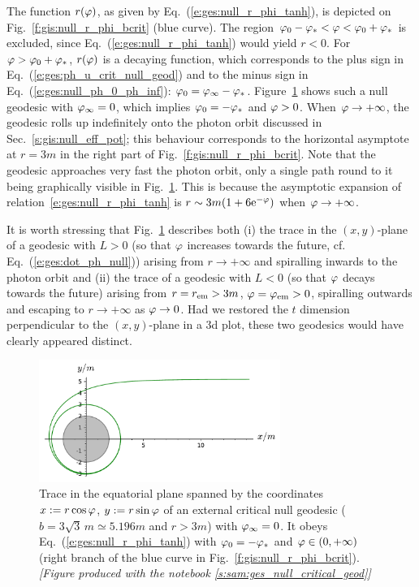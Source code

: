 The function $r(\varphi)$, as given by Eq.~(\ref{e:ges:null_r_phi_tanh}), is
depicted on Fig.~\ref{f:gis:null_r_phi_bcrit} (blue curve).
The region $\varphi_0-\varphi_* < \varphi < \varphi_0 + \varphi_*$ is excluded, since
Eq.~(\ref{e:ges:null_r_phi_tanh}) would yield $r<0$. For $\varphi > \varphi_0 + \varphi_*$,
$r(\varphi)$ is a decaying
function, which corresponds to the
plus sign in Eq.~(\ref{e:ges:ph_u_crit_null_geod}) and to the minus sign in
Eq.~(\ref{e:ges:null_ph_0_ph_inf}): $\varphi_0 = \varphi_\infty - \varphi_*$.
Figure~\ref{f:gis:null_b_crit_from_inf_L_pos} shows such a null geodesic with
$\varphi_\infty=0$, which implies $\varphi_0 = - \varphi_*$ and $\varphi>0$.
When $\varphi\to +\infty$, the geodesic rolls up indefinitely onto the photon
orbit discussed in Sec.~\ref{s:gis:null_eff_pot}; this
behaviour corresponds to the horizontal asymptote at $r=3m$ in
the right part of Fig.~\ref{f:gis:null_r_phi_bcrit}.
Note that the geodesic approaches very fast the photon orbit, only a single
path round to it being graphically visible in Fig.~\ref{f:gis:null_b_crit_from_inf_L_pos}.
This is because the asymptotic expansion of relation~\eqref{e:ges:null_r_phi_tanh} is
$r\sim 3m(1+ 6\mathrm{e}^{-\varphi})$ when $\varphi\to+\infty$.

It is worth stressing that Fig.~\ref{f:gis:null_b_crit_from_inf_L_pos} describes both (i) the trace
in the $(x,y)$-plane of a
geodesic with $L>0$ (so that $\varphi$ increases towards the future, cf. Eq.~(\ref{e:ges:dot_ph_null})) arising from $r\to + \infty$
and spiralling inwards to the photon orbit
and (ii) the trace of a geodesic with $L<0$ (so that $\varphi$ decays towards the future)
arising from $r=r_{\rm em} > 3 m$, $\varphi=\varphi_{\rm em}>0$,
spiralling outwards and escaping to $r\to +\infty$ as $\varphi\to 0$. Had we restored the
$t$ dimension perpendicular to the $(x,y)$-plane in a 3d plot, these two geodesics would have
clearly appeared distinct.

\begin{figure}
\centerline{\includegraphics[width=0.7\textwidth]{ges_null_b_crit_from_inf_L_pos.pdf}}
\caption[]{\label{f:gis:null_b_crit_from_inf_L_pos} \footnotesize
Trace in the equatorial plane spanned by the coordinates $x:=r\cos\varphi$, $y:=r\sin\varphi$
of an external critical null geodesic ($b = 3\sqrt{3} \, m \simeq 5.196 m$ and
$r>3m$) with $\varphi_\infty=0$.
It obeys Eq.~(\ref{e:ges:null_r_phi_tanh}) with $\varphi_0 = -\varphi_*$ and $\varphi\in(0,+\infty)$
(right branch of the blue curve in Fig.~\ref{f:gis:null_r_phi_bcrit}).
\textsl{[Figure produced with the notebook \ref{s:sam:ges_null_critical_geod}]}
}
\end{figure}

